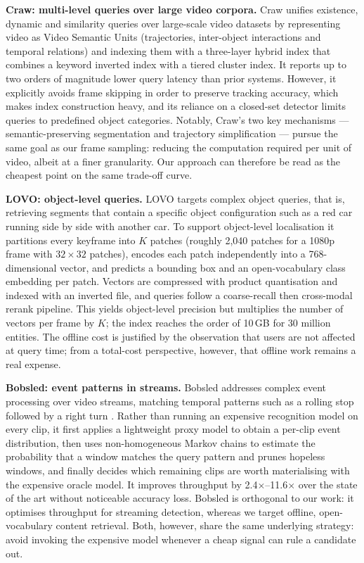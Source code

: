 \documentclass[journal]{IEEEtran}
\begin{document}
\noindent\textbf{Craw: multi-level queries over large video corpora.}
Craw unifies existence, dynamic and similarity queries over large-scale video datasets by
representing video as Video Semantic Units (trajectories, inter-object interactions and
temporal relations) and indexing them with a three-layer hybrid index that combines a
keyword inverted index with a tiered cluster index. It reports up to two orders of magnitude
lower query latency than prior systems. However, it explicitly avoids frame skipping in order
to preserve tracking accuracy, which makes index construction heavy, and its reliance on a
closed-set detector limits queries to predefined object categories. Notably, Craw's two key
mechanisms --- semantic-preserving segmentation and trajectory simplification --- pursue the
same goal as our frame sampling: reducing the computation required per unit of video, albeit
at a finer granularity. Our approach can therefore be read as the cheapest point on the same
trade-off curve.

\noindent\textbf{LOVO: object-level queries.}
LOVO targets complex object queries, that is, retrieving segments that contain a specific
object configuration such as a red car running side by side with another car. To support
object-level localisation it partitions every keyframe into $K$ patches (roughly 2{,}040
patches for a 1080p frame with $32\times32$ patches), encodes each patch independently into a
768-dimensional vector, and predicts a bounding box and an open-vocabulary class embedding per
patch. Vectors are compressed with product quantisation and indexed with an inverted file, and
queries follow a coarse-recall then cross-modal rerank pipeline. This yields object-level
precision but multiplies the number of vectors per frame by $K$; the index reaches the order of
10\,GB for 30 million entities. The offline cost is justified by the observation that users are
not affected at query time; from a total-cost perspective, however, that offline work remains a
real expense.

\noindent\textbf{Bobsled: event patterns in streams.}
Bobsled addresses complex event processing over video streams, matching temporal patterns such
as a rolling stop followed by a right turn \cite{bobsled2025}. Rather than running an expensive recognition model
on every clip, it first applies a lightweight proxy model to obtain a per-clip event
distribution, then uses non-homogeneous Markov chains to estimate the probability that a window
matches the query pattern and prunes hopeless windows, and finally decides which remaining clips
are worth materialising with the expensive oracle model. It improves throughput by
2.4$\times$--11.6$\times$ over the state of the art without noticeable accuracy loss.
Bobsled is orthogonal to our work: it optimises throughput for streaming detection, whereas we
target offline, open-vocabulary content retrieval. Both, however, share the same underlying
strategy: avoid invoking the expensive model whenever a cheap signal can rule a candidate out.
\end{document}
